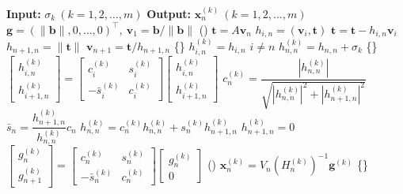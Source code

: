 \begin{algorithm}[H]\caption{}\label{alg:shifted-gmres}\begin{algorithmic}[1]
\Statex\textbf{Input:} $\sigma_k\ (k=1,2,\ldots,m)$
\Statex\textbf{Output:} $\bm x_n^{(k)}\ (k=1,2,\ldots,m)$
\State $\bm g=(\|\bm b\|,0,\ldots,0)^{\top},\ \bm v_1=\bm b/\|\bm b\|$
\State ()
\State $\bm t=A\bm v_n$
\State $h_{i,n}=(\bm v_i,\bm t)$
\State $\bm t=\bm t-h_{i,n}\bm v_i$
\EndFor
\State $h_{n+1,n}=\|\bm t\|$
\State $\bm v_{n+1}=\bm t/h_{n+1,n}$
\State \{\}
\State $h_{i,n}^{(k)}=h_{i,n}$  $i\ne n$
\State $h_{n,n}^{(k)}=h_{n,n}+\sigma_k$
\State \{\}
\State $\begin{bmatrix}h_{i,n}^{(k)}\\h_{i+1,n}^{(k)}\end{bmatrix}=\begin{bmatrix}c_i^{(k)}&s_i^{(k)}\\-\bar s_i^{(k)}&c_i^{(k)}\end{bmatrix}\begin{bmatrix}h_{i,n}^{(k)}\\h_{i+1,n}^{(k)}\end{bmatrix}$
\EndFor
\State $c_n^{(k)}=\dfrac{|h_{n,n}^{(k)}|}{\sqrt{|h_{n,n}^{(k)}|^2+|h_{n+1,n}^{(k)}|^2}}$
\State $\bar s_n=\dfrac{h_{n+1,n}^{(k)}}{h_{n,n}^{(k)}}c_n$
\State $h_{n,n}^{(k)}=c_n^{(k)}h_{n,n}^{(k)}+s_n^{(k)}h_{n+1,n}^{(k)}$
\State $h_{n+1,n}^{(k)}=0$
\State $\begin{bmatrix}g_n^{(k)}\\g_{n+1}^{(k)}\end{bmatrix}=\begin{bmatrix}c_n^{(k)}&s_n^{(k)}\\-\bar s_n^{(k)}&c_n^{(k)}\end{bmatrix}\begin{bmatrix}g_n^{(k)}\\0\end{bmatrix}$
\State ()
\State $\bm x_n^{(k)}=V_n(H_n^{(k)})^{-1}\bm g^{(k)}$
\EndIf\EndFor
\State \{\}
\EndFor\end{algorithmic}\end{algorithm}
